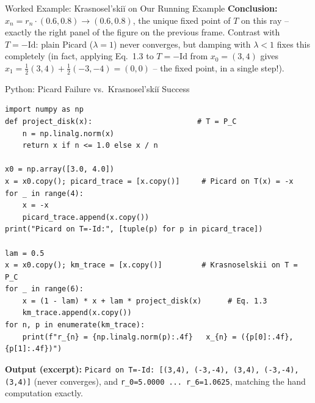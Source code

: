 \documentclass[aspectratio=169,10pt]{beamer}
\newcommand{\Id}{\mathrm{Id}}
\begin{document}
\begin{frame}[allowframebreaks]{Worked Example: Krasnosel'ski\u{i} on Our Running Example}
\textbf{Conclusion:} $x_n = r_n\cdot(0.6,0.8) \to (0.6,0.8)$, the unique
fixed point of $T$ on this ray -- exactly the right panel of the figure on
the previous frame. Contrast with $T=-\Id$: plain Picard ($\lambda=1$)
never converges, but damping with $\lambda<1$ fixes this completely (in
fact, applying Eq.\ 1.3 to $T=-\Id$ from $x_0=(3,4)$ gives
$x_1=\tfrac12(3,4)+\tfrac12(-3,-4)=(0,0)$ -- the fixed point, in a single
step!).

\end{frame}

\begin{frame}[fragile]{Python: Picard Failure vs.\ Krasnosel'ski\u{i} Success}

\begin{lstlisting}
import numpy as np
def project_disk(x):                        # T = P_C
    n = np.linalg.norm(x)
    return x if n <= 1.0 else x / n

x0 = np.array([3.0, 4.0])
x = x0.copy(); picard_trace = [x.copy()]     # Picard on T(x) = -x
for _ in range(4):
    x = -x
    picard_trace.append(x.copy())
print("Picard on T=-Id:", [tuple(p) for p in picard_trace])

lam = 0.5
x = x0.copy(); km_trace = [x.copy()]         # Krasnoselskii on T = P_C
for _ in range(6):
    x = (1 - lam) * x + lam * project_disk(x)      # Eq. 1.3
    km_trace.append(x.copy())
for n, p in enumerate(km_trace):
    print(f"r_{n} = {np.linalg.norm(p):.4f}   x_{n} = ({p[0]:.4f}, {p[1]:.4f})")
\end{lstlisting}

\medskip
\textbf{Output (excerpt):}
\texttt{Picard on T=-Id: [(3,4), (-3,-4), (3,4), (-3,-4), (3,4)]} (never
converges), and \texttt{r\_0=5.0000 ... r\_6=1.0625}, matching the
hand computation exactly.

\end{frame}
\end{document}
